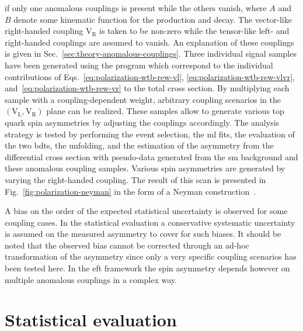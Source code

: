 if only one anomalous couplings is present while the others vanish, where $A$ and $B$ denote some kinematic function for the production and decay. The vector-like right-handed coupling $\mathrm{V}_\mathrm{R}$ is taken to be non-zero while the tensor-like left- and right-handed couplings are assumed to vanish. An explanation of these couplings is given in Sec.~\ref{sec:theory-anomalous-couplings}. Three individual signal samples have been generated using the \COMPHEP program which correspond to the individual contributions of Eqs.~\ref{eq:polarization-wtb-rew-vl}, \ref{eq:polarization-wtb-rew-vlvr}, and~\ref{eq:polarization-wtb-rew-vr} to the total cross section. By multiplying each sample with a coupling-dependent weight, arbitrary coupling scenarios in the $(\mathrm{V}_\mathrm{L},\mathrm{V}_\mathrm{R})$ plane can be realized. These samples allow to generate various top quark spin asymmetries by adjusting the couplings accordingly. The analysis strategy is tested by performing the event selection, the \gls{ml} fits, the evaluation of the two \glspl{bdt}, the unfolding, and the estimation of the asymmetry from the differential cross section with pseudo-data generated from the \gls{sm} background and these anomalous coupling samples. Various spin asymmetries are generated by varying the right-handed coupling. The result of this scan is presented in Fig.~\ref{fig:polarization-neyman} in the form of a Neyman construction~\cite{neyman1935}.



A bias on the order of the expected statistical uncertainty is observed for some coupling cases. In the statistical evaluation a conservative systematic uncertainty is assumed on the measured asymmetry to cover for such biases. It should be noted that the observed bias cannot be corrected through an ad-hoc transformation of the asymmetry since only a very specific coupling scenarios has been tested here. In the \gls{eft} framework the spin asymmetry depends however on multiple anomalous couplings in a complex way.



\section{Statistical evaluation}

